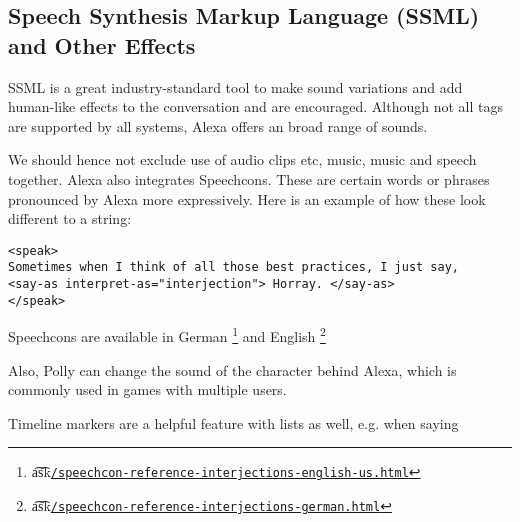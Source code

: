 \subsection*{Speech Synthesis Markup Language (SSML) and Other Effects}
SSML is a great industry-standard tool to make sound variations and add human-like effects to the conversation and are encouraged. Although not all tags are supported by all systems, Alexa offers an broad range of sounds.

We should hence not exclude use of audio clips etc, music, music and speech together. Alexa also integrates Speechcons. These are certain words or phrases pronounced by Alexa more expressively. Here is an example of how these look different to a string:

\begin{verbatim}
<speak>
Sometimes when I think of all those best practices, I just say,
<say-as interpret-as="interjection"> Horray. </say-as> 
</speak>
\end{verbatim}



\noindent Speechcons are available in German \footnote{\t{a\t{sk}}\href{https://developer.amazon.com/docs/custom-skills/speechcon-reference-interjections-english-us.html}{\lstinline|/speechcon-reference-interjections-english-us.html|}} and English \footnote{\t{a\t{sk}}\href{https://developer.amazon.com/docs/custom-skills/speechcon-reference-interjections-german.html}{\lstinline|/speechcon-reference-interjections-german.html|}}

\noindent Also, Polly can change the sound of the character behind Alexa, which is commonly used in games with multiple users.

\noindent Timeline markers are a helpful feature with lists as well, e.g. when saying 

\begin{flushright}
\end{flushright}





